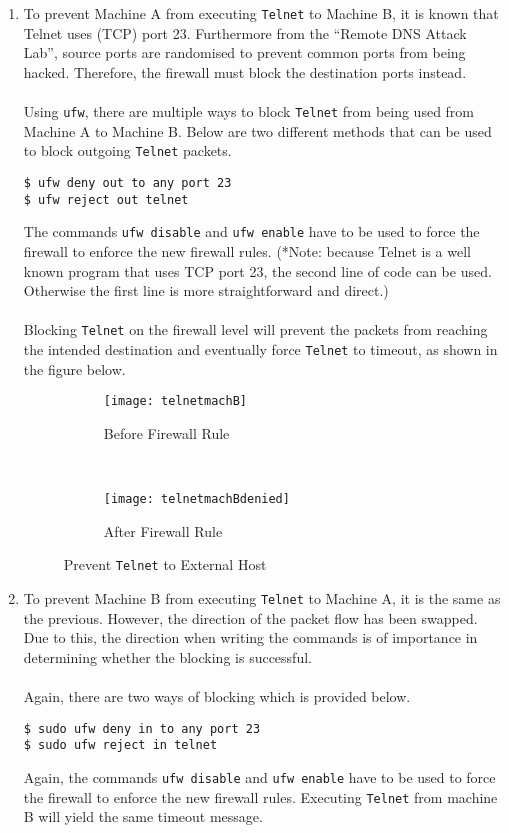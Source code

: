 \documentclass[a4paper,12pt]{article}
\begin{document}
\begin{enumerate}
\item To prevent Machine A from executing \texttt{Telnet} to Machine B, it is known that Telnet uses (TCP) port 23. Furthermore from the ``Remote DNS Attack Lab'', source ports are randomised to prevent common ports from being hacked. Therefore, the firewall must block the destination ports instead.\\\\Using \texttt{ufw}, there are multiple ways to block \texttt{Telnet} from being used from Machine A to Machine B. Below are two different methods that can be used to block outgoing \texttt{Telnet} packets.
\begin{verbatim}
$ ufw deny out to any port 23
$ ufw reject out telnet
\end{verbatim}
The commands \texttt{ufw disable} and \texttt{ufw enable} have to be used to force the firewall to enforce the new firewall rules. (*Note: because Telnet is a well known program that uses TCP port 23, the second line of code can be used. Otherwise the first line is more straightforward and direct.)\\\\
Blocking \texttt{Telnet} on the firewall level will prevent the packets from reaching the intended destination and eventually force \texttt{Telnet} to timeout, as shown in the figure below.


\begin{figure}[H]
    \centering
\begin{subfigure}[H]{0.45\textwidth}
\centering
\texttt{[image: telnetmachB]}
\caption{Before Firewall Rule}
\label{fig:MachB}
\end{subfigure}
~
\begin{subfigure}[H]{0.45\textwidth}
\centering
\texttt{[image: telnetmachBdenied]}
\caption{After Firewall Rule}
\label{fig:MachBDenied}
\end{subfigure}
    \caption{Prevent \texttt{Telnet} to External Host}
\end{figure}

\item To prevent Machine B from executing \texttt{Telnet} to Machine A, it is the same as the previous. However, the direction of the packet flow has been swapped. Due to this, the direction when writing the commands is of importance in determining whether the blocking is successful.\\\\Again, there are two ways of blocking which is provided below.
\begin{verbatim}
$ sudo ufw deny in to any port 23
$ sudo ufw reject in telnet
\end{verbatim}
Again, the commands \texttt{ufw disable} and \texttt{ufw enable} have to be used to force the firewall to enforce the new firewall rules. Executing \texttt{Telnet} from machine B will yield the same timeout message.


\end{enumerate}
\end{document}
